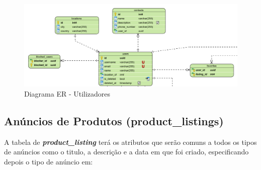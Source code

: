 \documentclass[a4paper, 12pt]{article} %
\begin{document}
\begin{figure}[ht]
	\centering

	\includegraphics[width=\textwidth]{../images/entity-relationship-diagram-users.png}
	\caption{Diagrama ER - Utilizadores}
	\label{fig:ER Users}
\end{figure}
\newpage
\subsection{\textbf{Anúncios de Produtos (product\_listings)}}

A tabela de \textbf{\textit{product\_listing}} terá os atributos que serão comuns a todos os tipos de anúncios como o titulo, a descrição e a data em que foi criado, especificando depois o tipo de anúncio em:
\end{document}
